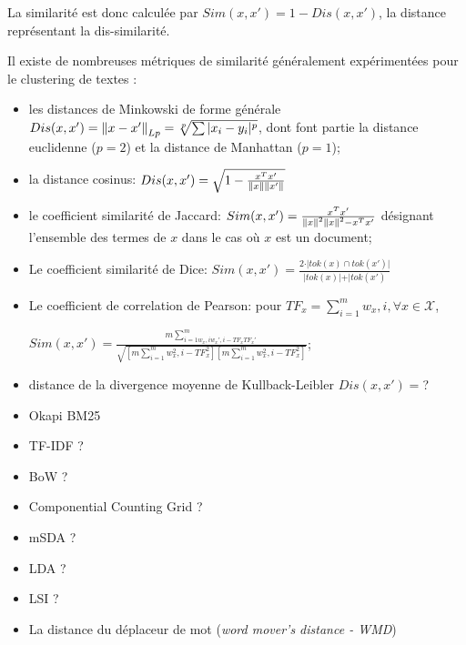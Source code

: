 La similarité est donc calculée par $Sim(x,x') = 1 - Dis(x,x')$, la distance représentant la dis-similarité.

Il existe de nombreuses métriques de similarité généralement expérimentées pour le clustering de textes \citep{huang2008similarityTextClustering}:
\begin{itemize}
	\item les distances de Minkowski de forme générale $Dis(x,x') = \left\lVert x - x'\right\rVert_{Lp} = \sqrt[p]{\sum \vert x_i - y_i \vert ^p}$, dont font partie la distance euclidenne ($p=2$) et la distance de Manhattan ($p=1$); 
	\item la distance cosinus: $Dis(x,x') = \sqrt{1 - \frac{x^Tx'}{\left\lVert x\right\rVert\left\lVert x'\right\rVert}}$
	\item le coefficient similarité de Jaccard: $Sim(x,x') = \frac{x^Tx'}{\left\lVert x\right\rVert^2\left\lVert x\right\rVert^2 - x^Tx'}$ désignant l'ensemble des termes de $x$ dans le cas où $x$ est un document;
	\item Le coefficient similarité de Dice: $Sim(x,x') = \frac{2\cdot \vert tok(x) \cap tok(x') \vert}{\vert tok(x) \vert + \vert tok(x')} $
	\item Le coefficient de correlation de Pearson: pour $TF_x = \sum\limits^m_{i=1} w_x,i, \forall x \in \mathcal{X}$,
	
	$Sim(x,x') = \frac{m \sum\limits^m_{i=1 w_x,i w_x',i - TF_xTF_x'}}{\sqrt{[m \sum\limits^m_{i=1} w^2_x,i - TF^2_x][m \sum\limits^m_{i=1} w^2_x,i - TF^2_x]}} $;
	\item distance de la divergence moyenne de Kullback-Leibler $Dis(x,x') = $?
	\item Okapi BM25
	\item TF-IDF ?
	\item BoW ?
	\item Componential Counting Grid ?
	\item mSDA ?
	\item LDA ?
	\item LSI ?
	\item \og La distance du déplaceur de mot \fg{} (\textit{word mover's distance - WMD}) \citep{kusner2015wordmoverdist}
\end{itemize}


